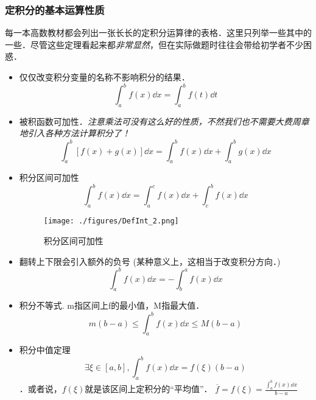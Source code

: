 \subsubsection{定积分的基本运算性质}
每一本高数教材\cite{同济高}\cite{Thomas}都会列出一张长长的定积分运算律的表格．这里只列举一些其中的一些．尽管这些定理看起来都\textsl{非常显然}，但在实际做题时往往会带给初学者不少困惑．
\begin{itemize}
\item 仅仅改变积分变量的名称不影响积分的结果．
$$\int^b_a f(x) \dd x = \int^b_a f(t) \dd t$$
\item 被积函数可加性．\textsl{注意乘法可没有这么好的性质，不然我们也不需要大费周章地引入各种方法计算积分了！}
$$\int^b_a [f(x)+g(x)] \dd x = \int^b_a f(x)\dd x + \int^b_a g(x)\dd x$$
\item 积分区间可加性
$$\int^b_a f(x) \dd x = \int^c_a f(x) \dd x  + \int^b_c f(x) \dd x $$
\begin{figure}[ht]
\centering
\texttt{[image: ./figures/DefInt\_2.png]}
\caption{积分区间可加性} \label{DefInt_fig2}
\end{figure}
\item 翻转上下限会引入额外的负号 (某种意义上，这相当于改变积分方向．)
$$\int^b_a f(x) \dd x = -\int^a_b f(x) \dd x$$
\item 积分不等式. m指区间上f的最小值，M指最大值．
$$m(b-a)\le\int^b_a f(x) \dd x \le M(b-a)$$
\item 积分中值定理
$$\exists \xi \in [a,b], \int^b_a f(x) \dd x = f(\xi)(b-a)$$．或者说，$f(\xi)$就是该区间上定积分的“平均值”． $ \overline f= f(\xi)=\frac{\int^b_a f(x) \dd x}{b-a}$
\end{itemize}

